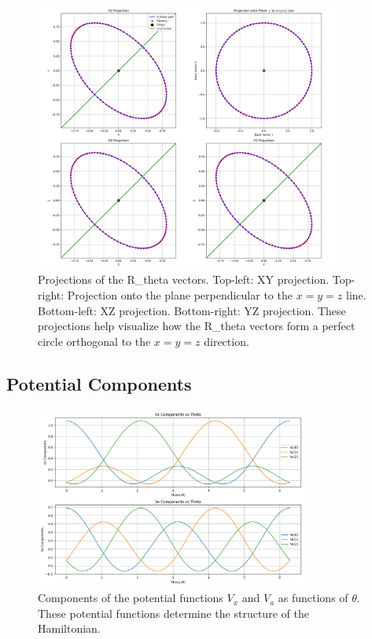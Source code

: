 \documentclass[12pt,a4paper]{article}
\begin{document}
\begin{figure}[H]
    \centering
    \includegraphics[width=0.9\textwidth]{improved_berry_phase_results/r_theta_3d_with_projections.png}
    \caption{Projections of the R\_theta vectors. Top-left: XY projection. Top-right: Projection onto the plane perpendicular to the $x=y=z$ line. Bottom-left: XZ projection. Bottom-right: YZ projection. These projections help visualize how the R\_theta vectors form a perfect circle orthogonal to the $x=y=z$ direction.}
    \label{fig:r_theta_projections}
\end{figure}

\subsection{Potential Components}

\begin{figure}[H]
    \centering
    \includegraphics[width=0.8\textwidth]{improved_berry_phase_results/potential_components.png}
    \caption{Components of the potential functions $V_x$ and $V_a$ as functions of $\theta$. These potential functions determine the structure of the Hamiltonian.}
    \label{fig:potential_components}
\end{figure}
\end{document}
